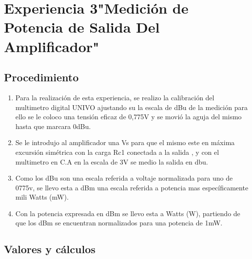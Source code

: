 \documentclass[12pt, letterpaper]{article}
\begin{document}
\section{Experiencia 3"Medición de Potencia de Salida Del Amplificador"}
\subsection{Procedimiento}
\begin{enumerate}
    \item Para la realización de esta experiencia, se realizo la calibración del multimetro digital UNIVO ajustando su la escala de dBu de la medición para ello se le coloco una tensión eficaz de 0,775V y se movió la aguja del mismo hasta que marcara 0dBu.
    \item   Se le introdujo al amplificador una Vs para que el mismo este en máxima excursión  simétrica con la carga Rc1 conectada a la salida , y con el multimetro en C.A en la escala de 3V se medio la salida en dbu.
    \item Como los dBu son una escala referida a voltaje normalizada para uno de 0775v, se llevo esta a dBm una escala referida a potencia mas específicamente mili Watts (mW).
    \item Con la potencia expresada en dBm se llevo esta a Watts (W), partiendo de que los dBm se encuentran normalizados para una potencia de 1mW. 
\end{enumerate}
\singlespacing

\subsection{Valores y cálculos}
\end{document}
